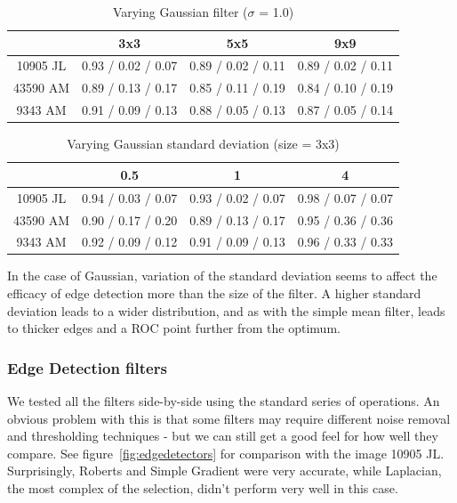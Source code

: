 \documentclass[10pt,a4paper]{article}
\begin{document}
\vspace{-5mm}

\begin{table}[H]
\centering
\caption{Varying Gaussian filter ($\sigma$ = 1.0)}
\begin{tabular}{|c|c|c|c|}
\hline
          & \textbf{3x3}       & \textbf{5x5}       & \textbf{9x9}       \\ \hline
10905 JL  & 0.93 / 0.02 / 0.07 & 0.89 / 0.02 / 0.11 & 0.89 / 0.02 / 0.11 \\ \hline
43590 AM  & 0.89 / 0.13 / 0.17 & 0.85 / 0.11 / 0.19 & 0.84 / 0.10 / 0.19 \\ \hline
9343 AM   & 0.91 / 0.09 / 0.13 & 0.88 / 0.05 / 0.13 & 0.87 / 0.05 / 0.14 \\ \hline
\end{tabular}
\end{table}

\vspace{-5mm}

\begin{table}[H]
\centering
\caption{Varying Gaussian standard deviation (size = 3x3)}
\begin{tabular}{|c|c|c|c|}
\hline
          & \textbf{0.5}       & \textbf{1}         & \textbf{4}         \\ \hline
10905 JL  & 0.94 / 0.03 / 0.07 & 0.93 / 0.02 / 0.07 & 0.98 / 0.07 / 0.07 \\ \hline
43590 AM  & 0.90 / 0.17 / 0.20 & 0.89 / 0.13 / 0.17 & 0.95 / 0.36 / 0.36 \\ \hline
9343 AM   & 0.92 / 0.09 / 0.12 & 0.91 / 0.09 / 0.13 & 0.96 / 0.33 / 0.33 \\ \hline
\end{tabular}
\end{table}

In the case of Gaussian, variation of the standard deviation seems to affect the efficacy of edge detection more than the size of the filter. A higher standard deviation leads to a wider distribution, and as with the simple mean filter, leads to thicker edges and a ROC point further from the optimum. 




\subsubsection*{Edge Detection filters}
We tested all the filters side-by-side using the standard series of operations. An obvious problem with this is that some filters may require different noise removal and thresholding techniques - but we can still get a good feel for how well they compare. See figure~\ref{fig:edgedetectors} for comparison with the image 10905 JL. Surprisingly, Roberts and Simple Gradient were very accurate, while Laplacian, the most complex of the selection, didn’t perform very well in this case.
\end{document}
